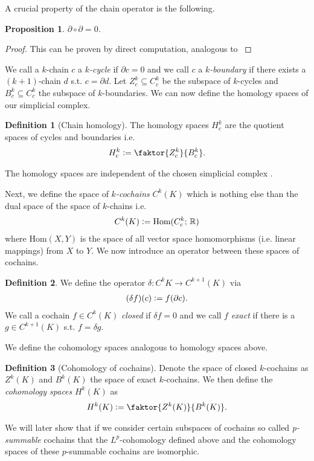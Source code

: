 \documentclass[12pt,a4paper]{article}
\newtheorem{proposition}{Proposition}
\theoremstyle{definition}
\newtheorem{definition}{Definition}
\newcommand{\real}{\mathbb{R}}
\begin{document}
A crucial property of the chain operator is the following.

\begin{proposition}
    $\partial \circ \partial = 0$.
\end{proposition}
\begin{proof}
    This can be proven by direct computation, analogous to 
    \cite[Chap.4, Lemma 1.6]{topology_and_geometry}
\end{proof}

We call a $k$-chain $c$ a \textit{$k$-cycle} if $\partial c = 0$ and we call $c$ 
a \textit{$k$-boundary} if there exists a $(k+1)$-chain $d$ s.t. 
$c = \partial d$. Let $Z^k_c \subseteq C^k_c$ be the subspace of $k$-cycles
and $B^k_c \subseteq C^k_c$ the subspace of $k$-boundaries.
We can now define the homology spaces of our simplicial complex.

\begin{definition}[Chain homology]
    The homology spaces $H^k_c$ are the quotient spaces of 
    cycles and boundaries i.e.
    \begin{align*}
        H^k_c\vcentcolon= \faktor{Z^k_c}{B^k_c}.
    \end{align*}
\end{definition}
\noindent The homology spaces are independent of the chosen simplicial complex
\cite{}. %


Next, we define the space of \textit{$k$-cochains} $C^k(K)$ which is nothing 
else than the dual space of the space of $k$-chains i.e.
\begin{align*}
    C^k(K) \vcentcolon= \text{Hom}(C^k_c;\, \real)
\end{align*}
where Hom$(X,Y)$ is the space of all vector space homomorphisms (i.e. linear 
mappings) from $X$ to $Y$.
We now introduce an operator between these spaces of cochains.
\begin{definition}
    We define the operator $\delta: C^k{K} \rightarrow C^{k+1}(K)$ via
    \begin{align*}
        (\delta f) (c) \vcentcolon= f(\partial c).
    \end{align*}
    We call a cochain $f \in C^k(K)$ \textit{closed} if $\delta f = 0$ 
    and we call $f$
    \textit{exact} if there is a $g \in C^{k+1}(K)$ s.t. $f = \delta g$.
\end{definition}
We define the cohomology spaces analogous to homology spaces above.
\begin{definition}[Cohomology of cochains]
    Denote the space of closed $k$-cochains as $Z^k(K)$ and $B^k(K)$ the space
    of exact $k$-cochains. We then define the \textit{cohomology spaces}
    $H^k(K)$ as
    \begin{align*}
        H^k(K) \vcentcolon= \faktor{Z^k(K)}{B^k(K)}.
    \end{align*}
\end{definition}
We will later show that if we consider certain subspaces of cochains so called
\textit{p-summable} cochains that the $L^p$-cohomology defined above and the
cohomology spaces of these $p$-summable cochains are isomorphic.
\end{document}
